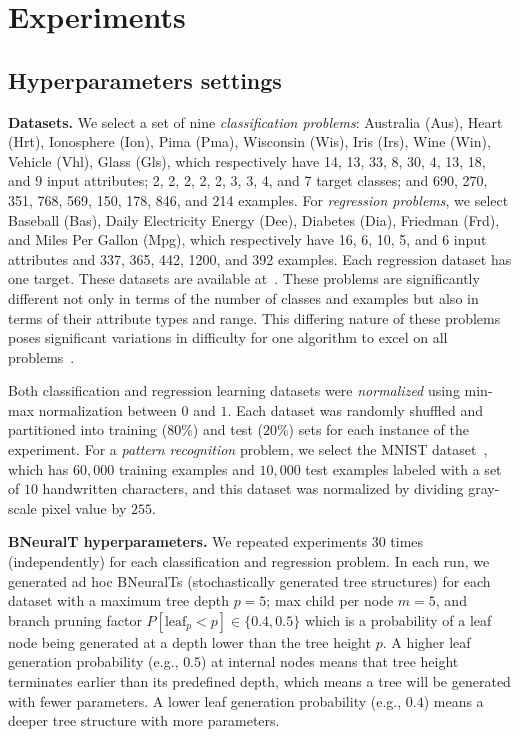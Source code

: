 \documentclass[11pt,a4paper]{article}
\begin{document}
    \section{Experiments}
    \label{sec:exp_setup}
\subsection{Hyperparameters settings}
    \label{sec:hyperparamter}
    \textbf{Datasets.} We select a set of nine \textit{classification problems}: Australia (Aus), Heart (Hrt), Ionosphere (Ion), Pima (Pma), Wisconsin (Wis), Iris (Irs), Wine (Win), Vehicle (Vhl), Glass (Gls), which respectively have 14, 13, 33, 8, 30, 4, 13, 18, and 9 input attributes; 2, 2, 2, 2, 2, 3, 3, 4, and 7 target classes; and 690, 270, 351, 768, 569, 150, 178, 846, and 214 examples. For \textit{regression problems}, we select Baseball (Bas), Daily Electricity Energy (Dee), Diabetes (Dia), Friedman (Frd), and Miles Per Gallon (Mpg), which respectively have 16, 6, 10, 5, and 6 input attributes and 337, 365, 442, 1200, and 392 examples. Each regression dataset has one target. These datasets are available at~\citep{lichman2013uci,keelDataSet}. These problems are significantly different not only in terms of the number of classes and examples but also in terms of their attribute types and range. This differing nature of these problems poses significant variations in difficulty for one algorithm to excel on all problems~\citep{wolpert1996lack}. 
    
    Both classification and regression learning datasets were \textit{normalized} using min-max normalization between $0$ and $1.$ Each dataset was randomly shuffled and partitioned into training ($80\%$) and test ($20\%$) sets for each instance of the experiment. 
For a \textit{pattern recognition} problem, we select the MNIST dataset~\citep{mnistDataSet}, which has $60,000$ training examples and $10,000$ test examples labeled with a set of $10$ handwritten characters, and this dataset was normalized by dividing gray-scale pixel value by $255.$
    
    
    \textbf{BNeuralT hyperparameters.} We repeated experiments 30 times (independently) for each classification and regression problem. In each run, we generated ad hoc BNeuralTs (stochastically generated tree structures) for each dataset with a maximum tree depth $ p = 5$; max child per node $ m = 5$, and branch pruning factor $ P[\text{leaf}_{p} < p]  \in \{0.4,0.5\}$ which is a probability of a leaf node being generated  at a depth lower than the tree height $p$. A higher leaf generation probability (e.g., $0.5$) at internal nodes means that tree height terminates earlier than its predefined depth, which means a tree will be generated with fewer parameters. A lower leaf generation probability (e.g., $0.4$) means a deeper tree structure with more parameters.
\end{document}

